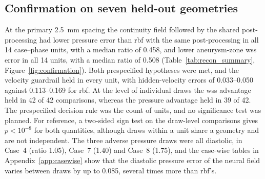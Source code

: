 \documentclass[12pt,a4paper]{article}
\newcommand{\WSS}{\ac{wss}\xspace}
\newcommand{\RBF}{\ac{rbf}\xspace}
\theoremstyle{definition}
\numberwithin{equation}{section}
\begin{document}



\subsection{Confirmation on seven held-out geometries}
\label{sec:confirmation}
At the primary 2.5~mm spacing the continuity field followed by the shared post-processing had lower pressure error than \RBF with the same post-processing in all 14 case--phase units, with a median ratio of 0.458, and lower aneurysm-zone \WSS error in all 14 units, with a median ratio of 0.508 (Table~\ref{tab:recon_summary}, Figure~\ref{fig:confirmation}). Both prespecified hypotheses were met, and the velocity guardrail held in every unit, with hidden-velocity errors of 0.033--0.050 against 0.113--0.169 for \RBF. At the level of individual draws the \WSS advantage held in 42 of 42 comparisons, whereas the pressure advantage held in 39 of 42. The prespecified decision rule was the count of units, and no significance test was planned. For reference, a two-sided sign test on the draw-level comparisons gives $p<10^{-8}$ for both quantities, although draws within a unit share a geometry and are not independent. The three adverse pressure draws were all diastolic, in Case~4 (ratio 1.05), Case~7 (1.40) and Case~8 (1.75), and the case-wise tables in Appendix~\ref{app:casewise} show that the diastolic pressure error of the neural field varies between draws by up to 0.085, several times more than \RBF's.


\end{document}
